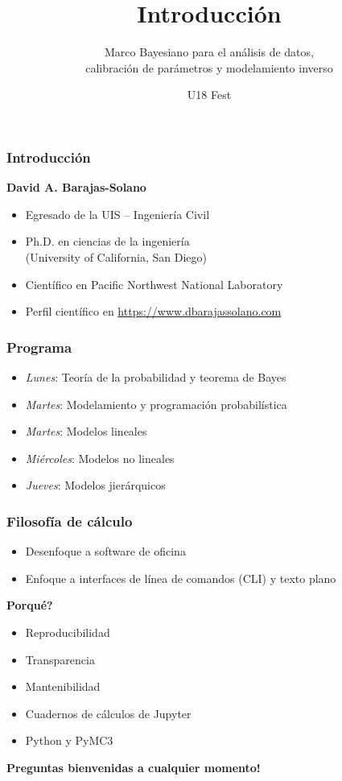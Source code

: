 \documentclass[10pt]{beamer}
\subtitle{Marco Bayesiano para el análisis de datos,\\
calibración de parámetros y modelamiento inverso}
\title{Introducción}
\institute{Universidad Industrial de Santander}
\date{U18 Fest}
\begin{document}
\begin{frame}[noframenumbering]
  \titlepage
\end{frame}

\begin{frame}
  \frametitle{Introducción}

  \textbf{David A. Barajas-Solano}
  \begin{itemize}
  \item Egresado de la UIS -- Ingeniería Civil
  \item Ph.D. en ciencias de la ingeniería\\(University of California, San Diego)
  \item Científico en Pacific Northwest National Laboratory
  \item Perfil científico en \url{https://www.dbarajassolano.com}
  \end{itemize}
  
\end{frame}
%
\begin{frame}
  \frametitle{Programa}
  \begin{tcolorbox}[title=Fundamentos]
    \begin{itemize}
    \item \emph{Lunes}: Teoría de la probabilidad y teorema de Bayes
    \item \emph{Martes}: Modelamiento y programación probabilística
    \end{itemize}
  \end{tcolorbox}
  \begin{tcolorbox}[title=Regresión]
    \begin{itemize}
    \item \emph{Martes}: Modelos lineales
    \item \emph{Miércoles}: Modelos no lineales
    \item \emph{Jueves}: Modelos jierárquicos
    \end{itemize}
  \end{tcolorbox}
\end{frame}
%
\begin{frame}
  \frametitle{Filosofía de cálculo}
  \begin{itemize}
  \item Desenfoque a software de oficina
  \item Enfoque a interfaces de línea de comandos (CLI) y texto plano
  \end{itemize}
  
  \textbf{Porqué?}
  \begin{itemize}
  \item Reproducibilidad
  \item Transparencia
  \item Mantenibilidad
  \end{itemize}
  \pause
  \begin{tcolorbox}[title=En éste taller]
    \begin{itemize}
    \item Cuadernos de cálculos de Jupyter
    \item Python y PyMC3
    \end{itemize}
  \end{tcolorbox}
  \textbf{Preguntas bienvenidas a cualquier momento!}
\end{frame}
\end{document}
